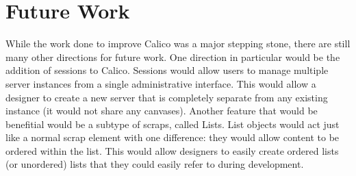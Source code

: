 \section*{Future Work}
While the work done to improve Calico was a major stepping stone, there are still many other directions for future work. One direction in particular would be the addition of sessions to Calico. Sessions would allow users to manage multiple server instances from a single administrative interface. This would allow a designer to create a new server that is completely separate from any existing instance (it would not share any canvases). Another feature that would be benefitial would be a subtype of scraps, called Lists. List objects would act just like a normal scrap element with one difference: they would allow content to be ordered within the list. This would allow designers to easily create ordered lists (or unordered) lists that they could easily refer to during development. 